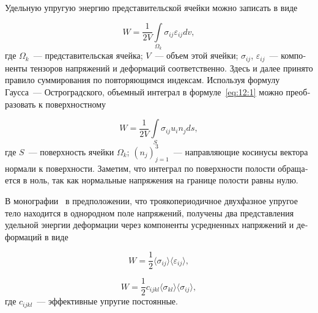 \begin{russian}

Удельную упругую энергию представительской ячейки можно записать в виде

\begin{equation}
W=\frac{1}{2V}\int\limits_{\Omega_k}\sigma_{ij}\varepsilon_{ij}dv,
\label{eq:12:1}
\end{equation}
где $\Omega_k$~--- представительская ячейка; $V$~--- объем этой ячейки; $\sigma_{ij}$, $\varepsilon_{ij}$~--- компоненты тензоров напряжений и деформаций соответственно. Здесь и далее принято правило суммирования по повторяющимся индексам. Используя формулу Гаусса~--- Остроградского, объемный интеграл в формуле~\eqref{eq:12:1} можно преобразовать к поверхностному

\begin{equation}
W=\frac{1}{2V}\int\limits_S\sigma_{ij}u_i n_j ds,
\label{eq:12:2}
\end{equation}
где $S$~--- поверхность ячейки $\Omega_k$; $(n_j)_{j=1}^3$~--- направляющие косинусы вектора нормали к поверхности. Заметим, что интеграл по поверхности полости обращается в ноль, так как нормальные напряжения на границе полости равны нулю.
 
В монографии~\cite{Vanin1985} в предположении, что троякопериодичное двухфазное упругое тело находится в однородном поле напряжений, получены два представления удельной энергии деформации через компоненты усредненных напряжений и деформаций в виде

\begin{equation}
W=\frac{1}{2}\langle\sigma_{ij}\rangle\langle\varepsilon_{ij}\rangle,
\label{eq:12:3}
\end{equation}

\begin{equation}
W=\frac{1}{2}c_{ijkl}\langle\sigma_{kl}\rangle\langle\sigma_{ij}\rangle,
\label{eq:12:4}
\end{equation}
где $c_{ijkl}$~--- эффективные упругие постоянные.


\end{russian}
